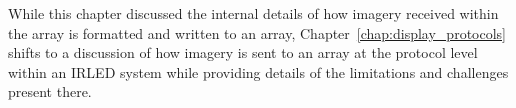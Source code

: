     While this chapter discussed the internal details of how imagery received within the array is formatted and written to an array, Chapter~\ref{chap:display_protocols} shifts to a discussion of how imagery is sent to an array at the protocol level within an IRLED system while providing details of the limitations and challenges present there.

